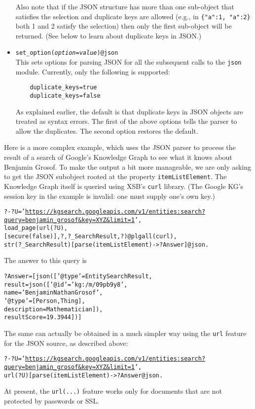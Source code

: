 \begin{itemize}
  Also note that if the JSON structure has more than one sub-object that
  satisfies the selection and duplicate keys are allowed
  (e.g., in \texttt{\{"a":1, "a":2\}} both 1 and 2 satisfy the selection)
  then only the first sub-object will be returned. (See below to learn about
  duplicate keys in JSON.)

\item \texttt{set\_option(\emph{option}=\emph{value})@\bs{}json}\\
  This sets options for parsing JSON for all the subsequent calls to the
  \texttt{\bs{}json} module. Currently, only the following is supported:
\begin{verbatim}
    duplicate_keys=true
    duplicate_keys=false
\end{verbatim}
  As explained earlier, the default is that duplicate keys in JSON objects
  are treated as syntax errors. The first of the above options tells the
  parser to allow the duplicates. The second option restores the default.
\end{itemize}

Here is a more complex example, which uses the JSON parser to
process the result of a search of
Google's Knowledge Graph to see what it knows about Benjamin Grosof.
To make the output a bit more manageable, we are only asking to get the
JSON subobject rooted at the property \texttt{itemListElement}.
The Knowledge Graph itself is queried using XSB's \texttt{curl}
library. 
(The Google KG's
session key in the example is invalid: one must supply one's own key.)
\begin{alltt}
?- ?U = '\url{https://kgsearch.googleapis.com/v1/entities:search?query=benjamin_grosof&key=XYZ&limit=1}',
   load_page(url(?U),
             [secure(false)], ?, ?_SearchResult, ?)@\bs{}plgall(curl),
   str(?_SearchResult)[parse(itemListElement) -> ?Answer]@\bs{}json.
\end{alltt}
The answer to this query is
\begin{alltt}
?Answer = [json(['@type' = EntitySearchResult,
                 result = json(['@id' = 'kg:/m/09pb9y8',
                                name = 'Benjamin Nathan Grosof',
                                '@type' = [Person, Thing],
                                description = Mathematician]),
                 resultScore = 19.3944])]
\end{alltt}

The same can actually be obtained in a much simpler way using the
\texttt{url} feature for the JSON source, as described above:
\begin{alltt}
?- ?U = '\url{https://kgsearch.googleapis.com/v1/entities:search?query=benjamin_grosof&key=XYZ&limit=1}',
   url(?U)[ parse(itemListElement) -> ?Answer @\bs{}json.
\end{alltt}
At present, the \texttt{url(...)} feature works only for documents
that are not protected by passwords or SSL. 

